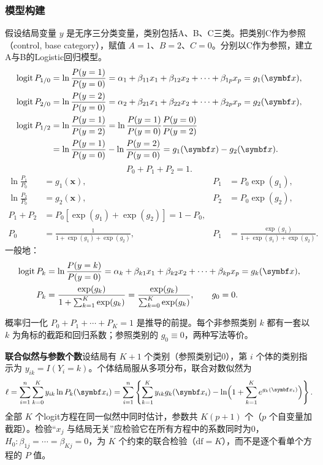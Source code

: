 \subsubsection{模型构建}
假设结局变量 $y$ 是无序三分类变量，类别包括A、B、C三类。把类别C作为参照（control, base category），赋值 $A=1$、$B=2$、$C=0$。分别以C作为参照，建立A与B的Logistic回归模型。
\begin{align*}
\logit P_{1/0}&=\ln\frac{P(y=1)}{P(y=0)}
 =\alpha_1+\beta_{11}x_1+\beta_{12}x_2+\cdots+\beta_{1p}x_p=g_1(\bm x),\\
\logit P_{2/0}&=\ln\frac{P(y=2)}{P(y=0)}
 =\alpha_2+\beta_{21}x_1+\beta_{22}x_2+\cdots+\beta_{2p}x_p=g_2(\bm x),\\
\logit P_{1/2}&=\ln\frac{P(y=1)}{P(y=2)}
 =\ln\frac{P(y=1)}{P(y=0)}\frac{P(y=0)}{P(y=2)}\\
&=\ln\frac{P(y=1)}{P(y=0)}-\ln\frac{P(y=2)}{P(y=0)}
 =g_1(\bm x)-g_2(\bm x).
\end{align*}
\[
P_0+P_1+P_2=1.
\]
\begin{align*}
\ln\frac{P_1}{P_0}&=g_1(\bm x),&P_1&=P_0\exp(g_1),\\
\ln\frac{P_2}{P_0}&=g_2(\bm x),&P_2&=P_0\exp(g_2),\\
P_1+P_2&=P_0[\exp(g_1)+\exp(g_2)]=1-P_0,\\
P_0&=\frac1{1+\exp(g_1)+\exp(g_2)},&
P_1&=\frac{\exp(g_1)}{1+\exp(g_1)+\exp(g_2)}.
\end{align*}
一般地：
\begin{align*}
\logit P_k&=\ln\frac{P(y=k)}{P(y=0)}
 =\alpha_k+\beta_{k1}x_1+\beta_{k2}x_2+\cdots+\beta_{kp}x_p=g_k(\bm x),\\
P_k&=\frac{\exp(g_k)}{1+\sum_{k=1}^K\exp(g_k)}
 =\frac{\exp(g_k)}{\sum_{k=0}^K\exp(g_k)},\qquad g_0=0.
\end{align*}
\begin{annotation}概率归一化 $P_0+P_1+\cdots+P_K=1$ 是推导的前提。每个非参照类别 $k$ 都有一套以 $k$ 为角标的截距和回归系数；参照类别的 $g_0\equiv0$，两种写法等价。\end{annotation}
\textbf{联合似然与参数个数}\quad 设结局有 $K+1$ 个类别（参照类别记0），第 $i$ 个体的类别指示为 $y_{ik}=I(Y_i=k)$。个体结局服从多项分布，联合对数似然为
\[
\ell=\sum_{i=1}^n\sum_{k=0}^Ky_{ik}\ln P_k(\bm x_i)
=\sum_{i=1}^n\left\{\sum_{k=1}^Ky_{ik}g_k(\bm x_i)-\ln\Bigl(1+\sum_{k=1}^K e^{g_k(\bm x_i)}\Bigr)\right\}.
\]
全部 $K$ 个logit方程在同一似然中同时估计，参数共 $K(p+1)$ 个（$p$ 个自变量加截距）。检验“$x_j$ 与结局无关”应检验它在所有方程中的系数同时为0，$H_0:\beta_{1j}=\cdots=\beta_{Kj}=0$，为 $K$ 个约束的联合检验（$\mathrm{df}=K$），而不是逐个看单个方程的 $P$ 值。


